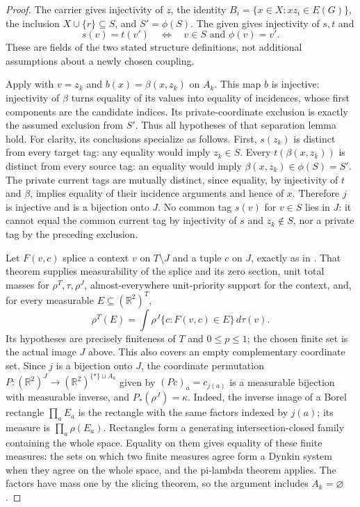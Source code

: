 \begin{proof}
The carrier 
gives injectivity of $z$, the identity
$B_i=\{x\in X:xz_i\in E(G)\}$, the inclusion $X\cup\{r\}\subseteq S$,
and $S'=\phi(S)$. The given
gives injectivity of $s,t$ and
\[
 s(v)=t(v')\quad\Longleftrightarrow\quad v\in S\text{ and }\phi(v)=v'.
\]
These are fields of the two stated structure definitions, not additional
assumptions about a newly chosen coupling.

Apply  with
$v=z_k$ and $b(x)=\beta(x,z_k)$ on $A_k$. This map $b$ is injective:
injectivity of $\beta$ turns equality of its values into equality of
incidences, whose first components are the candidate indices. Its
private-coordinate exclusion is exactly the assumed exclusion from
$S'$. Thus all hypotheses of that separation lemma hold. For clarity,
its conclusions specialize as follows. First, $s(z_k)$ is distinct from every target tag: any equality would
imply $z_k\in S$. Every $t(\beta(x,z_k))$ is distinct from every source
tag: an equality would imply $\beta(x,z_k)\in\phi(S)=S'$.
The private current tags are mutually distinct, since equality, by
injectivity of $t$ and $\beta$, implies equality of their incidence
arguments and hence of $x$. Therefore $j$ is injective and is a bijection
onto $J$. No common tag $s(v)$ for $v\in S$ lies in $J$: it cannot equal
the common current tag by injectivity of $s$ and $z_k\notin S$, nor a
private tag by the preceding exclusion.

Let $F(v,c)$ splice a context $v$ on $T\setminus J$ and a tuple $c$ on
$J$, exactly as in .
That theorem supplies measurability of the splice and its zero section,
unit total masses for $\rho^T,\tau,\rho^J$, almost-everywhere unit-priority
support for the context, and, for every measurable $E\subseteq(\mathbb R^2)^T$,
\[
 \rho^T(E)=\int \rho^J\{c:F(v,c)\in E\}\,d\tau(v).
\]
Its hypotheses are precisely finiteness of $T$ and $0\le p\le1$; the
chosen finite set is the actual image $J$ above. This also covers an
empty complementary coordinate set. Since $j$ is a bijection onto $J$,
the coordinate permutation $P:(\mathbb R^2)^J\to
(\mathbb R^2)^{\{*\}\sqcup A_k}$ given by $(Pc)_a=c_{j(a)}$
is a measurable bijection with measurable inverse, and $P_*(\rho^J)=\kappa$.
Indeed, the inverse image of a Borel rectangle $\prod_a E_a$ is the
rectangle with the same factors indexed by $j(a)$; its measure is
$\prod_a\rho(E_a)$. Rectangles form a generating intersection-closed
family containing the whole space. Equality on them gives equality of
these finite measures: the sets on which two finite measures agree form
a Dynkin system when they agree on the whole space, and the
pi-lambda theorem applies. The factors have mass one by the slicing
theorem, so the argument includes $A_k=\varnothing$.


\end{proof}
